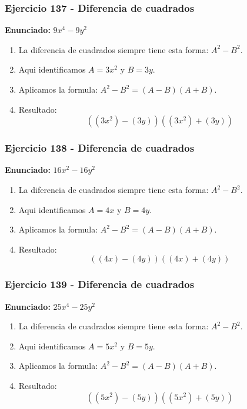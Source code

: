 \documentclass[11pt,a4paper]{article}
\begin{document}
\vspace{0.2cm}
\subsubsection*{Ejercicio 137 - Diferencia de cuadrados}
\textbf{Enunciado:} $ 9 x^{4} - 9 y^{2} $\par
\begin{enumerate}[leftmargin=2em]
\item La diferencia de cuadrados siempre tiene esta forma: \(A^2-B^2\).
\item Aqui identificamos \(A=3 x^{2}\) y \(B=3 y\).
\item Aplicamos la formula: \(A^2-B^2=(A-B)(A+B)\).
\item Resultado: \[\boxed{\left(\left(3 x^{2}\right)-\left(3 y\right)\right)\left(\left(3 x^{2}\right)+\left(3 y\right)\right)}\]
\end{enumerate}

\vspace{0.2cm}
\subsubsection*{Ejercicio 138 - Diferencia de cuadrados}
\textbf{Enunciado:} $ 16 x^{2} - 16 y^{2} $\par
\begin{enumerate}[leftmargin=2em]
\item La diferencia de cuadrados siempre tiene esta forma: \(A^2-B^2\).
\item Aqui identificamos \(A=4 x\) y \(B=4 y\).
\item Aplicamos la formula: \(A^2-B^2=(A-B)(A+B)\).
\item Resultado: \[\boxed{\left(\left(4 x\right)-\left(4 y\right)\right)\left(\left(4 x\right)+\left(4 y\right)\right)}\]
\end{enumerate}

\vspace{0.2cm}
\subsubsection*{Ejercicio 139 - Diferencia de cuadrados}
\textbf{Enunciado:} $ 25 x^{4} - 25 y^{2} $\par
\begin{enumerate}[leftmargin=2em]
\item La diferencia de cuadrados siempre tiene esta forma: \(A^2-B^2\).
\item Aqui identificamos \(A=5 x^{2}\) y \(B=5 y\).
\item Aplicamos la formula: \(A^2-B^2=(A-B)(A+B)\).
\item Resultado: \[\boxed{\left(\left(5 x^{2}\right)-\left(5 y\right)\right)\left(\left(5 x^{2}\right)+\left(5 y\right)\right)}\]
\end{enumerate}
\end{document}
